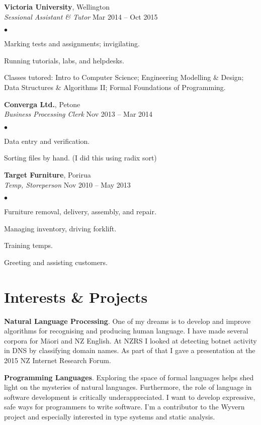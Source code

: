 \documentclass[margin,line]{res}
\newenvironment{list2}{
  \begin{list}{$\bullet$}{%
      \setlength{\itemsep}{0in}
      \setlength{\parsep}{0in} \setlength{\parskip}{0in}
      \setlength{\topsep}{0in} \setlength{\partopsep}{0in}
      \setlength{\leftmargin}{0.2in}}}
  {\end{list}}
\begin{document}
\begin{resume}
    {\bf Victoria University}, Wellington\\
    {\em Sessional Assistant \& Tutor} \hfill {Mar 2014 -- Oct 2015}
    \begin{list2}
	\item Marking tests and assignments; invigilating.
	\item Running tutorials, labs, and helpdesks.
	\item Classes tutored: Intro to Computer Science; Engineering Modelling \& Design; Data Structures \& Algorithms II; Formal Foundations of Programming.
    \end{list2}

  {\bf Converga Ltd.}, Petone\\
  {\em Business Processing Clerk} \hfill {Nov 2013 -- Mar 2014}
  \begin{list2} %
	\item Data entry and verification.
	\item Sorting files by hand. (I did this using radix sort)
  \end{list2}

  {\bf Target Furniture}, Porirua\\
  {\em Temp, Storeperson} \hfill{Nov 2010 -- May 2013}
  \begin{list2} %
	\item Furniture removal, delivery, assembly, and repair. 
	\item Managing inventory, driving forklift.
	\item Training temps.
	\item Greeting and assisting customers.
  \end{list2}


\section{\sc Interests \& Projects}

{\bf Natural Language Processing}. One of my dreams is to develop and improve algorithms for recognising and producing human language. I have made several corpora for M\=aori and NZ English. At NZRS I looked at detecting botnet activity in DNS by classifying domain names. As part of that I gave a presentation at the 2015 NZ Internet Research Forum.

{\bf Programming Languages}. Exploring the space of formal languages helps shed light on the mysteries of natural languages. Furthermore, the role of language in software development is critically underappreciated. I want to develop expressive, safe ways for programmers to write software. I'm a contributor to the Wyvern project and especially interested in type systems and static analysis.


\end{resume}
\end{document}
